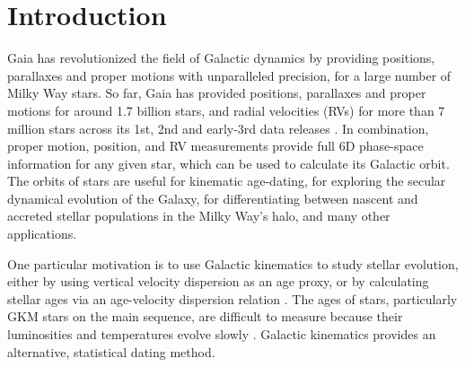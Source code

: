 \section{Introduction}

Gaia has revolutionized the field of Galactic dynamics by providing positions,
parallaxes and proper motions with unparalleled precision, for a large number
of Milky Way stars.
So far, Gaia has provided positions, parallaxes and proper motions for around
1.7 billion stars, and radial velocities (RVs) for more than 7 million stars
across its 1st, 2nd and early-3rd data releases \citep{gaia, gaia_dr2,
gaia_edr3}.
In combination, proper motion, position, and RV measurements provide full 6D
phase-space information for any given star, which can be used to calculate its
Galactic orbit.
The orbits of stars are useful for kinematic age-dating, for exploring the
secular dynamical evolution of the Galaxy, for differentiating between nascent
and accreted stellar populations in the Milky Way's halo, and many other
applications.

One particular motivation
is to use Galactic kinematics to study stellar evolution, either by using
vertical velocity dispersion as an age proxy, or by calculating stellar ages
via an age-velocity dispersion relation \citep[\eg][]{angus2020, lu2021}.
The ages of stars, particularly GKM stars on the main sequence, are difficult
to measure because their luminosities and temperatures evolve slowly
\citep[see][for a review of stellar ages]{soderblom2010}.
Galactic kinematics provides an alternative, statistical dating method.

